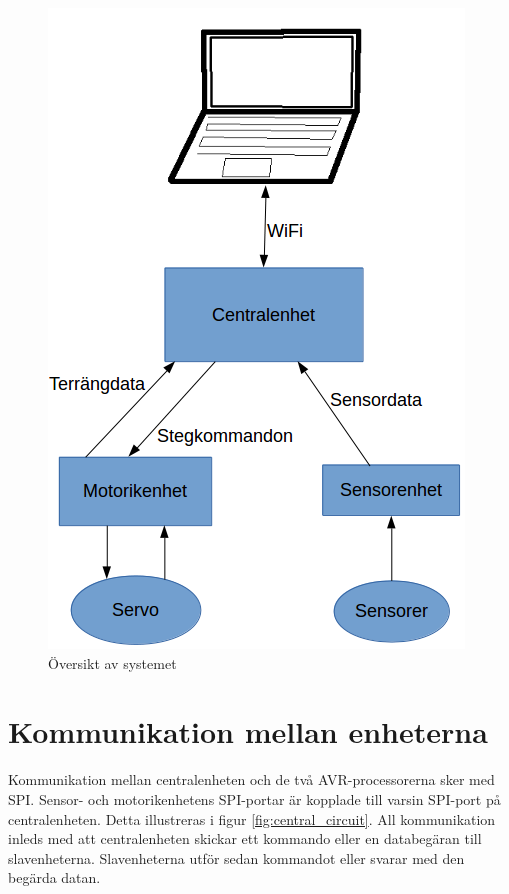 \documentclass[a4paper,titlepage,12pt]{article}
\begin{document}
	\begin{figure}[h!]
		\centering
		\includegraphics[width=0.5\linewidth]{../images/overview.png}
		\caption{Översikt av systemet\label{fig:overview}}
	\end{figure}

	\section{Kommunikation mellan enheterna}
	Kommunikation mellan centralenheten och de två AVR-processorerna sker
	med SPI. Sensor- och motorikenhetens SPI-portar är kopplade till varsin
	SPI-port på centralenheten. Detta illustreras i figur \ref{fig:central_circuit}.
	All kommunikation inleds med att centralenheten skickar ett kommando 
    eller en databegäran till slavenheterna.
	Slavenheterna utför sedan kommandot eller svarar med den begärda datan.
\end{document}
